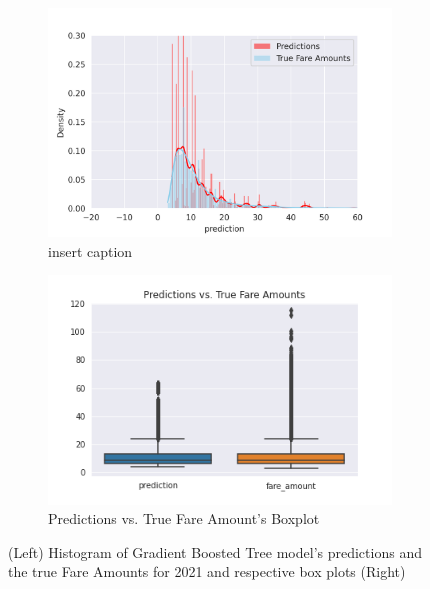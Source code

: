 \documentclass[11pt]{article}
\begin{document}
\begin{figure}[H]
     \centering
     \begin{subfigure}[b]{0.45\textwidth}
         \centering
         \includegraphics[width=\textwidth]{preds_vs_true.png}
         \caption{insert caption}
         \label{fig:y equals x}
     \end{subfigure}
     \hfill
     \begin{subfigure}[b]{0.45\textwidth}
         \centering
         \includegraphics[width=\textwidth]{preds_vs_fare_boxplot.png}
         \caption{Predictions vs. True Fare Amount's Boxplot}
         \label{fig:three sin x}
     \end{subfigure}
        \caption{(Left) Histogram of Gradient Boosted Tree model's predictions and the true Fare Amounts for 2021 and respective box plots (Right)}
        \label{fig:three graphs}
\end{figure}
\end{document}
